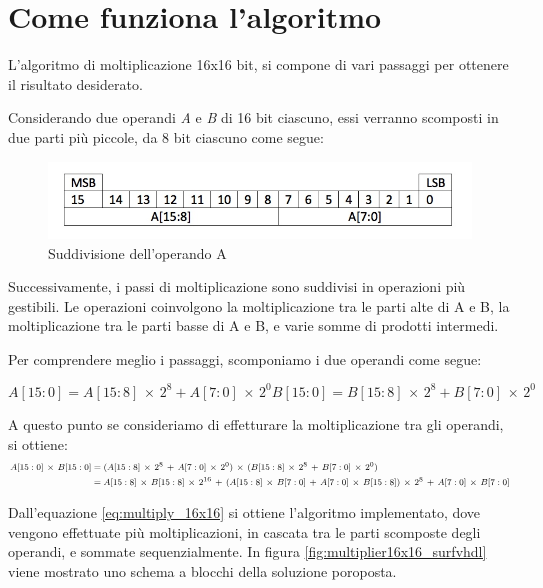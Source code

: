 \documentclass[titlepage]{report}
\begin{document}
	\section{Come funziona l'algoritmo}
	\label{sec:how_it_works}
		L'algoritmo di moltiplicazione 16x16 bit, si compone di vari passaggi per ottenere il risultato desiderato.
		
		Considerando due operandi \textit{A} e \textit{B} di 16 bit ciascuno, essi verranno scomposti in due parti più piccole, da 8 bit ciascuno come segue: 

		\begin{figure}[ht]
			\centering
			\includegraphics[scale=0.4]{./img/operand-16-bit.jpeg}
			\caption{Suddivisione dell'operando A}
			\label{fig:operando_a}
		\end{figure}

		Successivamente, i passi di moltiplicazione sono suddivisi in operazioni più gestibili. Le operazioni coinvolgono la moltiplicazione tra le parti alte di A e B, la moltiplicazione tra le parti basse di A e B, e varie somme di prodotti intermedi.

		Per comprendere meglio i passaggi, scomponiamo i due operandi come segue:

		\begin{equation}
			A[15:0] = A[15:8]\,\times\,2^8 +A[7:0]\,\times\,2^0
			B[15:0] = B[15:8]\,\times\,2^8 +B[7:0]\,\times\,2^0	
			\label{eq:operandi}	
		\end{equation}
		
		A questo punto se consideriamo di effetturare la moltiplicazione tra gli operandi, si ottiene:
		\begin{equation}
			\footnotesize
			\label{eq:multiply_16x16}
			\begin{aligned}
				A[15:0]\,\times\,B[15:0] &= (A[15:8]\,\times\,2^8\,+\,A[7:0]\,\times\,2^0)\,\times\,(B[15:8]\,\times\,2^8\,+\,B[7:0]\,\times\,2^0) \\ 
				&= A[15:8]\,\times\,B[15:8]\,\times\,2^{16}\,+\,(A[15:8]\,\times\,B[7:0]\,+\,A[7:0]\,\times\,B[15:8])\,\times\,2^8\,+\,A[7:0]\,\times\,B[7:0]
			\end{aligned}
		\end{equation}

		Dall'equazione \ref{eq:multiply_16x16} si ottiene l'algoritmo implementato, dove vengono effettuate più moltiplicazioni, in cascata tra le parti scomposte degli operandi, e sommate sequenzialmente. In figura \ref{fig:multiplier16x16_surfvhdl} viene mostrato uno schema a blocchi della soluzione poroposta.
	
\end{document}

